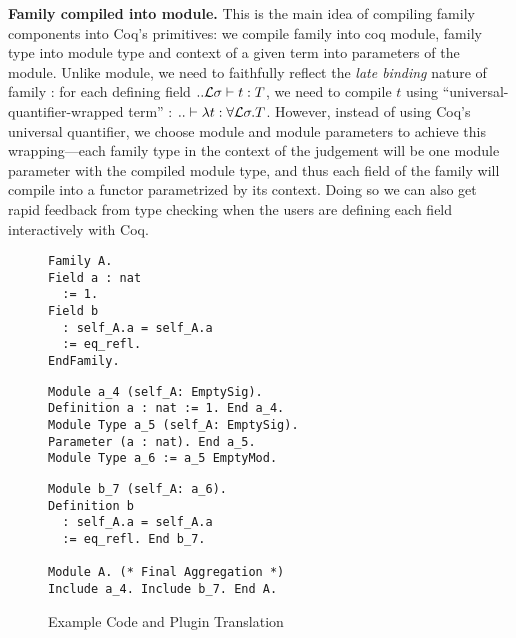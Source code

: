 \textbf{Family compiled into module.} This is the main idea of compiling family components into Coq's primitives: we compile family into coq module, family type into module type and context of a given term into parameters of the module. Unlike module, we need to faithfully reflect the \textit{late binding} nature of family : for each defining field $ .. {\mathcal{L}}\sigma \vdash t : T $, we need to compile $t$ using ``universal-quantifier-wrapped term'' : $.. \vdash \lambda t : \forall {\mathcal{L}} \sigma. T$. However, instead of using Coq's universal quantifier, we choose module and module parameters to achieve this wrapping---each family type in the context of the judgement will be one module parameter with the compiled module type, and thus each field of the family will compile into a functor parametrized by its context. Doing so we can also get rapid feedback from type checking when the users are defining each field interactively with Coq.
\begin{figure}
  \begin{minipage}[t]{0.25\linewidth}
\begin{verbatim}
Family A.
Field a : nat 
  := 1.
Field b 
  : self_A.a = self_A.a
  := eq_refl.
EndFamily.
\end{verbatim}
  \end{minipage}
  \begin{minipage}[t]{0.4\linewidth}
\begin{verbatim}
Module a_4 (self_A: EmptySig).
Definition a : nat := 1. End a_4.
Module Type a_5 (self_A: EmptySig).
Parameter (a : nat). End a_5.
Module Type a_6 := a_5 EmptyMod.
\end{verbatim}
  \end{minipage}
  \begin{minipage}[t]{0.3\linewidth}
\begin{verbatim}
Module b_7 (self_A: a_6).
Definition b 
  : self_A.a = self_A.a 
  := eq_refl. End b_7.
  
Module A. (* Final Aggregation *)
Include a_4. Include b_7. End A.
\end{verbatim}
  \end{minipage}
  \caption{Example Code and Plugin Translation}\label{fig:plugin-example1}
\end{figure}


